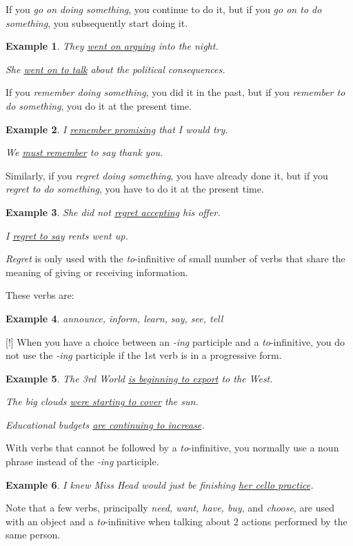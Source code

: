 \documentclass[oneside]{book}
\numberwithin{equation}{section}
\newtheorem{example}{Example}[section]
\begin{document}
%
If you \textit{go on doing something}, you continue to do it, but if you \textit{go on to do something}, you subsequently start doing it.
\begin{example}
    They \underline{went on arguing} into the night.
    
    She \underline{went on to talk} about the political consequences.
\end{example}
If you \textit{remember doing something}, you did it in the past, but if you \textit{remember to do something}, you do it at the present time.
\begin{example}
    I \underline{remember promising} that I would try.
    
    We \underline{must remember} to say thank you.
\end{example}
Similarly, if you \textit{regret doing something}, you have already done it, but if you \textit{regret to do something}, you have to do it at the present time.
\begin{example}
    She did not \underline{regret accepting} his offer.
    
    I \underline{regret to say} rents went up.
\end{example}
\textit{Regret} is only used with the \textit{to}-infinitive of small number of verbs that share the meaning of giving or receiving information.

These verbs are:
\begin{example}
    announce, inform, learn, say, see, tell
\end{example}
%
\noindent{} [!] When you have a choice between an \textit{-ing} participle and a \textit{to}-infinitive, you do not use the \textit{-ing} participle if the 1st verb is in a progressive form.
\begin{example}
    The 3rd World \underline{is beginning to export} to the West.
    
    The big clouds \underline{were starting to cover} the sun.
    
    Educational budgets \underline{are continuing to increase}.
\end{example}
With verbs that cannot be followed by a \textit{to}-infinitive, you normally use a noun phrase instead of the \textit{-ing} participle.
\begin{example}
    I knew Miss Head would just be finishing \underline{her cello practice}.
\end{example}
%
\noindent{} Note that a few verbs, principally \textit{need, want, have, buy}, and \textit{choose}, are used with an object and a \textit{to}-infinitive when talking about 2 actions performed by the same person.
\end{document}
